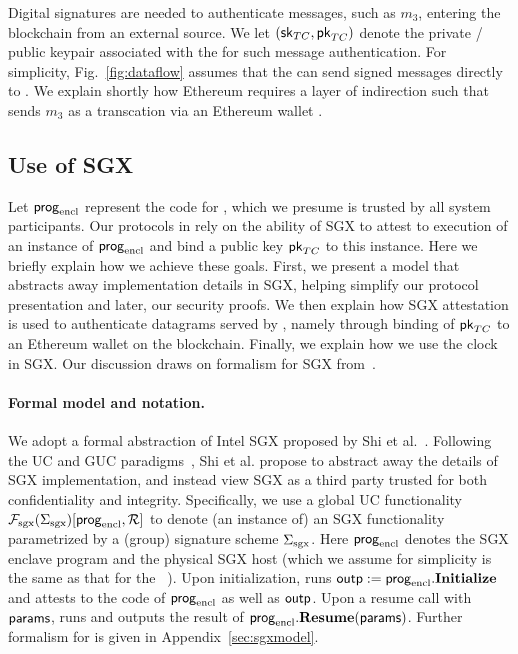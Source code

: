 Digital signatures are needed to authenticate messages, such as $m_3$, entering the blockchain from an external source. We let $({\sf sk}_{TC}, {\sf pk}_{TC})$ denote the private / public keypair associated with the \encname for such message authentication. For simplicity, Fig.~\ref{fig:dataflow} assumes that the \encname can send signed messages directly to \tcont. We explain shortly how Ethereum requires a layer of indirection such that \tc sends $m_3$ as a transcation via an Ethereum wallet \tcadd.


\subsection{Use of SGX}
\label{sec:useofsgx}

Let ${\sf prog}_{\textrm{encl}}$ represent the code for \encname, which we presume is trusted by all system participants. Our protocols in \tc rely on the ability of SGX to attest to execution of an instance of ${\sf prog}_{\textrm{encl}}$ and bind a public key ${\sf pk}_{TC}$ to this instance. Here we briefly explain how we achieve these goals. First, we present a model that abstracts away implementation details in SGX, helping simplify our protocol presentation and later, our security proofs. We then explain how SGX attestation is used to authenticate datagrams served by \tcont, namely through binding of ${\sf pk}_{TC}$ to an Ethereum wallet on the blockchain. Finally, we explain how we use the clock in SGX. Our discussion draws on formalism for SGX from~\cite{sgxsok}.


\paragraph{\bf Formal model and notation.} 
We adopt a formal abstraction
of Intel SGX proposed by Shi et al.~\cite{sgxsok}. %
Following the UC and GUC paradigms~\cite{uc,guc,juc}, Shi et al.
propose to 
abstract away the details of SGX implementation,
and instead view SGX
as a third party trusted
for both confidentiality and integrity.
Specifically, we use a global UC  
functionality $\mathcal{F}_{\textrm{sgx}}({\Sigma_{\textrm{sgx}}})[{\sf prog}_{\textrm{encl}}, \mathcal{R}]$
to denote (an instance of) an SGX functionality parametrized
by a (group) signature scheme ${\Sigma_{\textrm{sgx}}}$.
Here ${\sf prog}_{\textrm{encl}}$ denotes the SGX enclave program and \relay the physical
SGX host (which we assume for simplicity is the same as that for the \tc~\medname).
Upon initialization, \fsgx runs ${\sf outp} := {\sf prog}_{\textrm{encl}}.{\bf Initialize}$
and attests to the code of ${\sf prog}_{\textrm{encl}}$ as well as ${\sf outp}$.
Upon a resume call with ${\sf params}$, \fsgx runs and outputs the result of
${\sf prog}_{\textrm{encl}}.{\bf Resume}({\sf params})$.
Further formalism for \fsgx is given in Appendix~\ref{sec:sgxmodel}.

